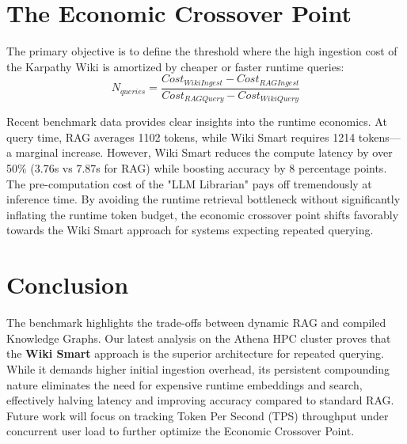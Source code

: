\documentclass[12pt]{article}
\begin{document}
\section{The Economic Crossover Point}
The primary objective is to define the threshold where the high ingestion cost of the Karpathy Wiki is amortized by cheaper or faster runtime queries:
\begin{equation}
N_{queries} = \frac{Cost_{WikiIngest} - Cost_{RAGIngest}}{Cost_{RAGQuery} - Cost_{WikiQuery}}
\end{equation}

Recent benchmark data provides clear insights into the runtime economics. At query time, RAG averages 1102 tokens, while Wiki Smart requires 1214 tokens---a marginal increase. However, Wiki Smart reduces the compute latency by over 50\% (3.76s vs 7.87s for RAG) while boosting accuracy by 8 percentage points. The pre-computation cost of the "LLM Librarian" pays off tremendously at inference time. By avoiding the runtime retrieval bottleneck without significantly inflating the runtime token budget, the economic crossover point shifts favorably towards the Wiki Smart approach for systems expecting repeated querying.

\section{Conclusion}
The benchmark highlights the trade-offs between dynamic RAG and compiled Knowledge Graphs. Our latest analysis on the Athena HPC cluster proves that the \textbf{Wiki Smart} approach is the superior architecture for repeated querying. While it demands higher initial ingestion overhead, its persistent compounding nature eliminates the need for expensive runtime embeddings and search, effectively halving latency and improving accuracy compared to standard RAG. Future work will focus on tracking Token Per Second (TPS) throughput under concurrent user load to further optimize the Economic Crossover Point.
\end{document}
